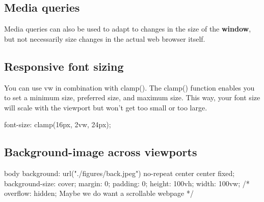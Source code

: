 \documentclass{report}
\begin{document}
    \bigbreak \noindent 
    \subsection{Media queries}
    \bigbreak \noindent 
    Media queries can also be used to adapt to changes in the size of the \textbf{window}, but not necessarily size changes in the actual web browser itself.

    \bigbreak \noindent 
    \subsection{Responsive font sizing}
    \bigbreak \noindent 
    You can use vw in combination with clamp(). The clamp() function enables you to set a minimum size, preferred size, and maximum size. This way, your font size will scale with the viewport but won't get too small or too large.
    \bigbreak \noindent 
    \begin{csscode}
    font-size: clamp(16px, 2vw, 24px);
    \end{csscode}


    \bigbreak \noindent 
    \subsection{Background-image across viewports}
    \bigbreak \noindent 
    \begin{csscode}
body {
    background: url("./figures/back.jpeg") no-repeat center center fixed;
    background-size: cover;
    margin: 0;
    padding: 0;
    height: 100vh;
    width: 100vw;
    /* overflow: hidden; Maybe we do want a scrollable webpage */
}
    \end{csscode}









    
    










    



























    
\end{document}
